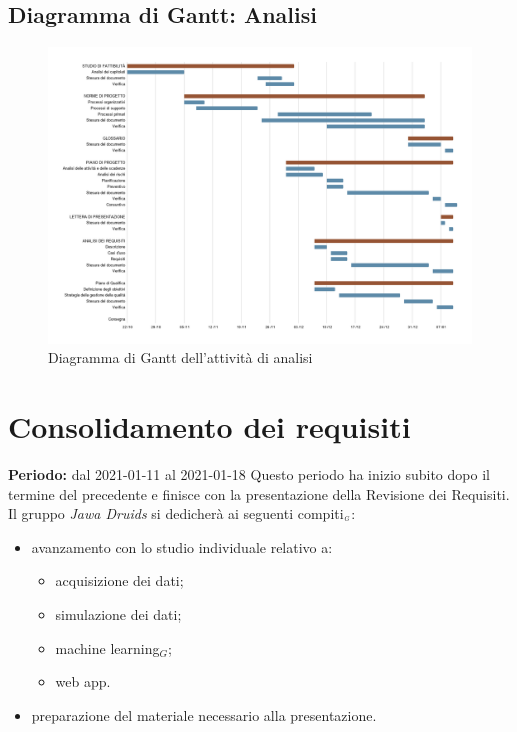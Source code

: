 \subsection{Diagramma di Gantt: Analisi}\label{PianificazioneDiagrammaDiGanttAnalisi}
\begin{figure}[!h]
	\begin{center}
		\includegraphics[width=1\linewidth]{../immagini/pdp/gantt_analisi.png}
		\caption{Diagramma di Gantt dell'attività di analisi}
	\end{center}
\end{figure}

\section{Consolidamento dei requisiti}\label{PianificazioneConsolidamentoDeiRequisiti}
\textbf{Periodo:} dal 2021-01-11 al 2021-01-18
Questo periodo ha inizio subito dopo il termine del precedente e finisce con la presentazione della Revisione dei Requisiti.
Il gruppo \textit{Jawa Druids} si dedicherà ai seguenti compiti$_{\scaleto{G}{3pt}}$:
\begin{itemize}
	\item avanzamento con lo studio individuale relativo a:
	\begin{itemize}
		\item acquisizione dei dati;
		\item simulazione dei dati;
		\item machine learning$_G$;
		\item web app.
	\end{itemize}
	\item preparazione del materiale necessario alla presentazione.
\end{itemize}
